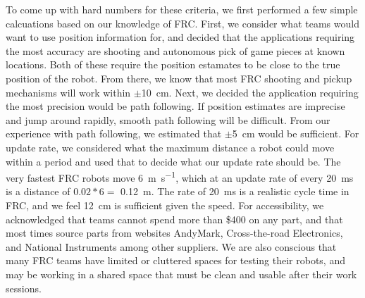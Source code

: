 \documentclass{article}
\begin{document}
To come up with hard numbers for these criteria, we first performed a few simple calcuations based on our knowledge of FRC. First, we consider what teams would want to use position information for, and decided that the applications requiring the most accuracy are shooting and autonomous pick of game pieces at known locations. Both of these require the position estamates to be close to the true position of the robot. From there, we know that most FRC shooting and pickup mechanisms will work within $\pm$\SI{10}{\centi\meter}. Next, we decided the application requiring the most precision would be path following. If position estimates are imprecise and jump around rapidly, smooth path following will be difficult. From our experience with path following, we estimated that $\pm$\SI{5}{\centi\meter} would be sufficient. For update rate, we considered what the maximum distance a robot could move within a period and used that to decide what our update rate should be. The very fastest FRC robots move \SI{6}{\meter\per\second}, which at an update rate of every \SI{20}{\milli\second} is a distance of $0.02*6 =$ \SI{0.12}{\meter}. The rate of \SI{20}{\milli\second} is a realistic cycle time in FRC, and we feel \SI{12}{\centi\meter} is sufficient given the speed. For accessibility, we acknowledged that teams cannot spend more than \$400 on any part, and that most times source parts from websites AndyMark, Cross-the-road Electronics, and National Instruments among other suppliers. We are also conscious that many FRC teams have limited or cluttered spaces for testing their robots, and may be working in a shared space that must be clean and usable after their work sessions.
\end{document}
